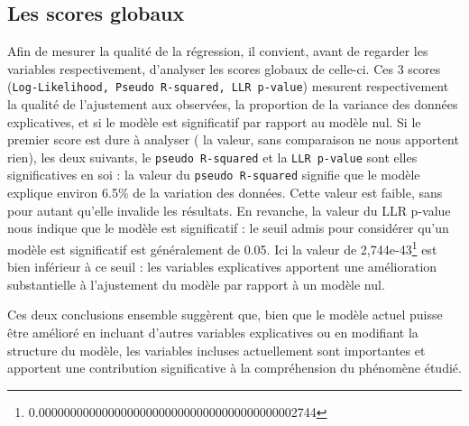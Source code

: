 \documentclass[12pt,a4paper,oneside,titlepage]{book} %
\begin{document}
\subsection{Les scores globaux}
Afin de mesurer la qualité de la régression, il convient, avant de regarder les variables respectivement, d'analyser les scores globaux de celle-ci. 
Ces 3 scores (\texttt{Log-Likelihood, Pseudo R-squared, LLR p-value}) mesurent respectivement la qualité de l'ajustement aux observées, la proportion de la variance des données explicatives, et si le modèle est significatif par rapport au modèle nul. 
Si le premier score est dure à analyser ( la valeur, sans comparaison ne nous apportent rien), les deux suivants, le \texttt{pseudo R-squared} et la \texttt{LLR p-value} sont elles significatives en soi : la valeur du \texttt{pseudo R-squared} signifie que le modèle explique environ 6.5\% de la variation des données. Cette valeur est faible, sans pour autant qu'elle invalide les résultats. 
En revanche, la valeur du LLR p-value nous indique que le modèle est significatif : le seuil admis pour considérer qu'un modèle est significatif est généralement de 0.05. Ici la valeur de 2,744e-43\footnote{0.00000000000000000000000000000000000000002744} est bien inférieur à ce seuil : les variables explicatives apportent une amélioration substantielle à l'ajustement du modèle par rapport à un modèle nul.

Ces deux conclusions ensemble suggèrent que, bien que le modèle actuel puisse être amélioré en incluant d'autres variables explicatives ou en modifiant la structure du modèle, les variables incluses actuellement sont importantes et apportent une contribution significative à la compréhension du phénomène étudié.
\end{document}
